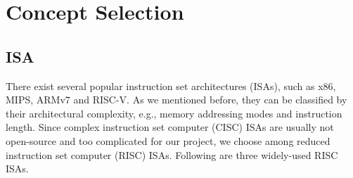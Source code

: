 
\let\clearpage\relax
\chapter{Concept Selection}

\section{ISA}\label{section:isa} %
There exist several popular instruction set architectures (ISAs), such as x86, MIPS, ARMv7 and RISC-V. As we mentioned before, they can be classified by their architectural complexity, e.g., memory addressing modes and instruction length. Since complex instruction set computer (CISC) ISAs are usually not open-source and too complicated for our project, we choose among reduced instruction set computer (RISC) ISAs. Following are three widely-used RISC ISAs.


